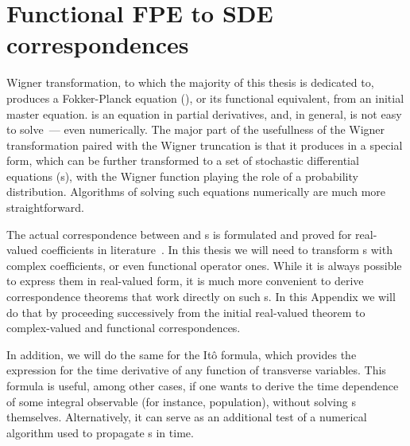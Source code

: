 \chapter{Functional FPE to SDE correspondences}
\label{cha:appendix:fpe-sde}

Wigner transformation, to which the majority of this thesis is dedicated to, produces a Fokker-Planck equation (), or its functional equivalent, from an initial master equation.
 is an equation in partial derivatives, and, in general, is not easy to solve~--- even numerically.
The major part of the usefullness of the Wigner transformation paired with the Wigner truncation is that it produces  in a special form, which can be further transformed to a set of stochastic differential equations (s), with the Wigner function playing the role of a probability distribution.
Algorithms of solving such equations numerically are much more straightforward.

The actual correspondence between  and s is formulated and proved for real-valued coefficients in literature~\cite{Risken1996}.
In this thesis we will need to transform s with complex coefficients, or even functional operator ones.
While it is always possible to express them in real-valued form, it is much more convenient to derive correspondence theorems that work directly on such s.
In this Appendix we will do that by proceeding successively from the initial real-valued theorem to complex-valued and functional correspondences.

In addition, we will do the same for the It\^o formula, which provides the expression for the time derivative of any function of transverse variables.
This formula is useful, among other cases, if one wants to derive the time dependence of some integral observable (for instance, population), without solving s themselves.
Alternatively, it can serve as an additional test of a numerical algorithm used to propagate s in time.



